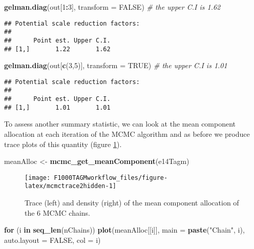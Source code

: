 \documentclass[9pt,a4paper,]{extarticle}
\newenvironment{Shaded}{\begin{snugshade}}{\end{snugshade}}
\newcommand{\CommentTok}[1]{\textcolor[rgb]{0.56,0.35,0.01}{\textit{#1}}}
\newcommand{\ControlFlowTok}[1]{\textcolor[rgb]{0.13,0.29,0.53}{\textbf{#1}}}
\newcommand{\DataTypeTok}[1]{\textcolor[rgb]{0.13,0.29,0.53}{#1}}
\newcommand{\DecValTok}[1]{\textcolor[rgb]{0.00,0.00,0.81}{#1}}
\newcommand{\KeywordTok}[1]{\textcolor[rgb]{0.13,0.29,0.53}{\textbf{#1}}}
\newcommand{\NormalTok}[1]{#1}
\newcommand{\OperatorTok}[1]{\textcolor[rgb]{0.81,0.36,0.00}{\textbf{#1}}}
\newcommand{\OtherTok}[1]{\textcolor[rgb]{0.56,0.35,0.01}{#1}}
\newcommand{\StringTok}[1]{\textcolor[rgb]{0.31,0.60,0.02}{#1}}
\begin{document}
\begin{Shaded}
\begin{Highlighting}[]
\KeywordTok{gelman.diag}\NormalTok{(out[}\DecValTok{1}\OperatorTok{:}\DecValTok{3}\NormalTok{], }\DataTypeTok{transform =} \OtherTok{FALSE}\NormalTok{) }\CommentTok{# the upper C.I is 1.62}
\end{Highlighting}
\end{Shaded}

\begin{verbatim}
## Potential scale reduction factors:
## 
##      Point est. Upper C.I.
## [1,]       1.22       1.62
\end{verbatim}

\begin{Shaded}
\begin{Highlighting}[]
\KeywordTok{gelman.diag}\NormalTok{(out[}\KeywordTok{c}\NormalTok{(}\DecValTok{3}\NormalTok{,}\DecValTok{5}\NormalTok{)], }\DataTypeTok{transform =} \OtherTok{TRUE}\NormalTok{) }\CommentTok{# the upper C.I is 1.01}
\end{Highlighting}
\end{Shaded}

\begin{verbatim}
## Potential scale reduction factors:
## 
##      Point est. Upper C.I.
## [1,]       1.01       1.01
\end{verbatim}

To assess another summary statistic, we can look at the mean
component allocation at each iteration of the MCMC algorithm and as
before we produce trace plots of this quantity (figure \ref{fig:mcmctrace2hidden}).

\begin{Shaded}
\begin{Highlighting}[]
\NormalTok{meanAlloc <-}\StringTok{ }\KeywordTok{mcmc_get_meanComponent}\NormalTok{(e14Tagm)}
\end{Highlighting}
\end{Shaded}

\begin{figure}

{\centering \texttt{[image: F1000TAGMworkflow\_files/figure-latex/mcmctrace2hidden-1]} 

}

\caption{Trace (left) and density (right) of the mean component allocation of the 6 MCMC chains.}\label{fig:mcmctrace2hidden}
\end{figure}

\begin{Shaded}
\begin{Highlighting}[]
\ControlFlowTok{for}\NormalTok{ (i }\ControlFlowTok{in} \KeywordTok{seq_len}\NormalTok{(nChains))}
    \KeywordTok{plot}\NormalTok{(meanAlloc[[i]], }\DataTypeTok{main =} \KeywordTok{paste}\NormalTok{(}\StringTok{"Chain"}\NormalTok{, i), }\DataTypeTok{auto.layout =} \OtherTok{FALSE}\NormalTok{, }\DataTypeTok{col =}\NormalTok{ i)}
\end{Highlighting}
\end{Shaded}
\end{document}
